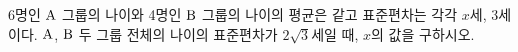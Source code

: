 6명인 $\mathrm{A}$ 그룹의 나이와 4명인 $\mathrm{B}$ 그룹의 나이의 평균은 같고 표준편차는 각각 $x$세, 3세이다. $\mathrm{A}$, $\mathrm{B}$ 두 그룹 전체의 나이의 표준편차가 $2\sqrt{3}$세일 때, $x$의 값을 구하시오.
